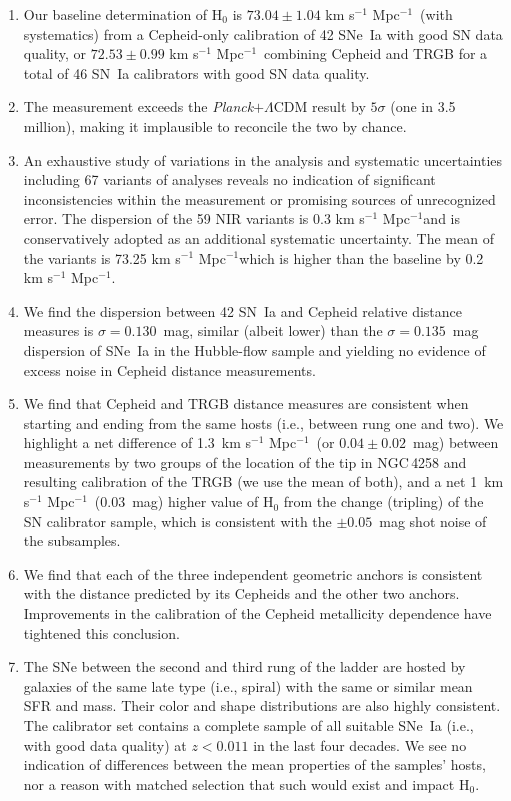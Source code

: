 \documentclass[12pt]{aastex631}
\newcommand{\kms}{km s$^{-1}$ Mpc$^{-1}$}
\newcommand{\kmss }{km s$^{-1}$ Mpc$^{-1}$\ }
\newcommand{\hsbase}{$ 73.04 \pm  1.04  $ km s$^{-1}$ Mpc$^{-1}$}
\newcommand{\hswtrgbmean}{$ 72.53 \pm 0.99 $ km s$^{-1}$ Mpc$^{-1}$}
\begin{document}
\begin{enumerate}

\item Our baseline determination of H$_0$ is \hsbase\ (with systematics) from a Cepheid-only calibration of 42 SNe~Ia with good SN data quality, or \hswtrgbmean\ combining Cepheid and TRGB for a total of 46 SN~Ia calibrators with good SN data quality.
   
\item The measurement exceeds the {\it Planck}$+\Lambda$CDM result by $5\sigma$ (one in 3.5 million), making it implausible to reconcile the two by chance.
   
\item An exhaustive study of variations in the analysis and systematic uncertainties including 67 variants of analyses reveals no indication of significant inconsistencies within the measurement or promising sources of unrecognized error.  The dispersion of the 59 NIR variants is 0.3 \kms and is conservatively adopted as an additional systematic uncertainty.  The mean of the variants is 73.25 \kms which is higher than the baseline by 0.2 \kms.

\item We find the dispersion between 42 SN~Ia and Cepheid relative distance measures is $\sigma=0.130$~mag, similar (albeit lower) than the $\sigma=0.135$~mag dispersion of SNe~Ia in the Hubble-flow sample and yielding no evidence of excess noise in Cepheid distance measurements.  
   
\item We find that Cepheid and TRGB distance measures are consistent when starting and ending from the same hosts (i.e., between rung one and two). We highlight a net difference of 1.3~\kmss (or $0.04 \pm 0.02$~mag) between measurements by two groups of the location of the tip in NGC$\,$4258 and resulting calibration of the TRGB (we use the mean of both), and a net 1~\kmss (0.03~mag) higher value of H$_0$ from the change (tripling) of the SN calibrator sample, which is consistent with the $\pm 0.05$~mag shot noise of the subsamples.
   
\item We find that each of the three independent geometric anchors is consistent with the distance predicted by its Cepheids and the other two anchors.  Improvements in the calibration of the Cepheid metallicity dependence have tightened this conclusion.
   
\item The SNe between the second and third rung of the ladder are hosted by galaxies of the same late type (i.e., spiral) with the same or similar mean SFR and mass.  Their color and shape distributions are also highly consistent.  The calibrator set contains a complete sample of all suitable SNe~Ia (i.e., with good data quality) at $z<0.011$ in the last four decades.  We see no indication of differences between the mean properties of the samples' hosts, nor a reason with matched selection that such would exist and impact H$_0$.  
   

\end{enumerate}
\end{document}
